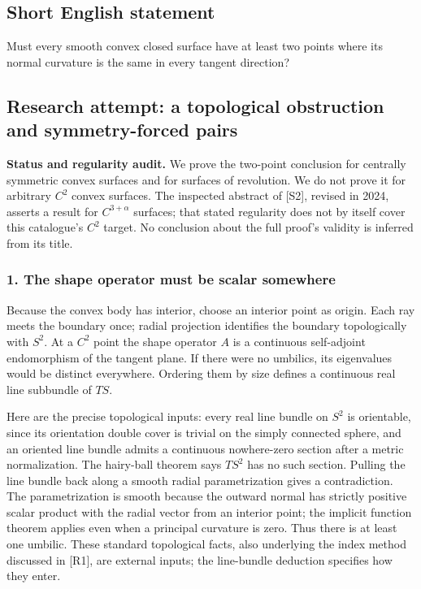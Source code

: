 \documentclass[11pt,a4paper]{article}
\begin{document}
\subsection{Short English statement}

Must every smooth convex closed surface have at least two points where its normal curvature is the same in every tangent direction?

\subsection{Research attempt: a topological obstruction and symmetry-forced pairs}
\textbf{Status and regularity audit.} We prove the two-point conclusion for centrally symmetric convex surfaces and for surfaces of revolution. We do not prove it for arbitrary $C^2$ convex surfaces. The inspected abstract of [S2], revised in 2024, asserts a result for $C^{3+\alpha}$ surfaces; that stated regularity does not by itself cover this catalogue's $C^2$ target. No conclusion about the full proof's validity is inferred from its title.

\subsubsection{1. The shape operator must be scalar somewhere}
Because the convex body has interior, choose an interior point as origin. Each ray meets the boundary once; radial projection identifies the boundary topologically with $S^2$. At a $C^2$ point the shape operator $A$ is a continuous self-adjoint endomorphism of the tangent plane. If there were no umbilics, its eigenvalues would be distinct everywhere. Ordering them by size defines a continuous real line subbundle of $TS$.

Here are the precise topological inputs: every real line bundle on $S^2$ is orientable, since its orientation double cover is trivial on the simply connected sphere, and an oriented line bundle admits a continuous nowhere-zero section after a metric normalization. The hairy-ball theorem says $TS^2$ has no such section. Pulling the line bundle back along a smooth radial parametrization gives a contradiction. The parametrization is smooth because the outward normal has strictly positive scalar product with the radial vector from an interior point; the implicit function theorem applies even when a principal curvature is zero. Thus there is at least one umbilic. These standard topological facts, also underlying the index method discussed in [R1], are external inputs; the line-bundle deduction specifies how they enter.
\end{document}
